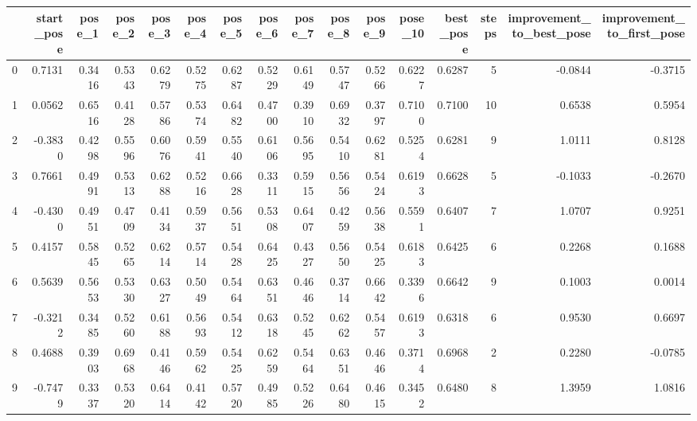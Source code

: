 \begin{tabular}{lrrrrrrrrrrrrrrr}
\toprule
{} &  start\_pose &  pose\_1 &  pose\_2 &  pose\_3 &  pose\_4 &  pose\_5 &  pose\_6 &  pose\_7 &  pose\_8 &  pose\_9 &  pose\_10 &  best\_pose &  steps &  improvement\_to\_best\_pose &  improvement\_to\_first\_pose \\
\midrule
0 &      0.7131 &  0.3416 &  0.5343 &  0.6279 &  0.5275 &  0.6287 &  0.5229 &  0.6149 &  0.5747 &  0.5266 &   0.6227 &     0.6287 &      5 &                   -0.0844 &                    -0.3715 \\
1 &      0.0562 &  0.6516 &  0.4128 &  0.5786 &  0.5374 &  0.6482 &  0.4700 &  0.3910 &  0.6932 &  0.3797 &   0.7100 &     0.7100 &     10 &                    0.6538 &                     0.5954 \\
2 &     -0.3830 &  0.4298 &  0.5596 &  0.6076 &  0.5941 &  0.5540 &  0.6106 &  0.5695 &  0.5410 &  0.6281 &   0.5254 &     0.6281 &      9 &                    1.0111 &                     0.8128 \\
3 &      0.7661 &  0.4991 &  0.5313 &  0.6288 &  0.5216 &  0.6628 &  0.3311 &  0.5915 &  0.5656 &  0.5424 &   0.6193 &     0.6628 &      5 &                   -0.1033 &                    -0.2670 \\
4 &     -0.4300 &  0.4951 &  0.4709 &  0.4134 &  0.5937 &  0.5651 &  0.5308 &  0.6407 &  0.4259 &  0.5638 &   0.5591 &     0.6407 &      7 &                    1.0707 &                     0.9251 \\
5 &      0.4157 &  0.5845 &  0.5265 &  0.6214 &  0.5714 &  0.5428 &  0.6425 &  0.4327 &  0.5650 &  0.5425 &   0.6183 &     0.6425 &      6 &                    0.2268 &                     0.1688 \\
6 &      0.5639 &  0.5653 &  0.5330 &  0.6327 &  0.5049 &  0.5464 &  0.6351 &  0.4646 &  0.3714 &  0.6642 &   0.3396 &     0.6642 &      9 &                    0.1003 &                     0.0014 \\
7 &     -0.3212 &  0.3485 &  0.5260 &  0.6188 &  0.5693 &  0.5412 &  0.6318 &  0.5245 &  0.6262 &  0.5457 &   0.6193 &     0.6318 &      6 &                    0.9530 &                     0.6697 \\
8 &      0.4688 &  0.3903 &  0.6968 &  0.4146 &  0.5962 &  0.5425 &  0.6259 &  0.5464 &  0.6351 &  0.4646 &   0.3714 &     0.6968 &      2 &                    0.2280 &                    -0.0785 \\
9 &     -0.7479 &  0.3337 &  0.5320 &  0.6414 &  0.4142 &  0.5720 &  0.4985 &  0.5226 &  0.6480 &  0.4615 &   0.3452 &     0.6480 &      8 &                    1.3959 &                     1.0816 \\
\bottomrule
\end{tabular}
